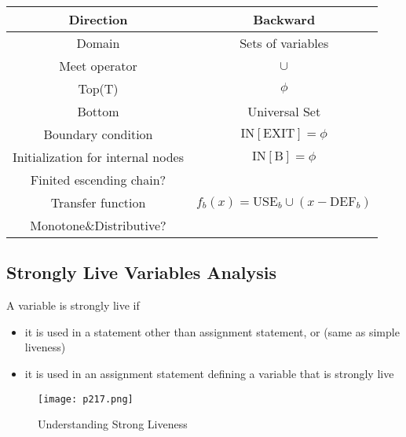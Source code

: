 \begin{center}
	\begin{tabular}{|c|c|}
		\hline Direction                         & Backward                                            \\
		\hline Domain                            & Sets	of	variables                                     \\
		\hline Meet operator                     & \( \cup \)                                          \\
		\hline Top(T)                            & $\phi$                                              \\
		\hline Bottom                            & Universal Set                                       \\
		\hline Boundary condition                & $\mathrm{IN[EXIT]} = \phi$                          \\
		\hline Initialization for internal nodes & $\mathrm{IN[B]} = \phi$                             \\
		\hline Finited escending chain?          & \checkmark                                          \\
		\hline Transfer function                 & $f_b(x) = \mathrm{USE}_b \cup (x - \mathrm{DEF}_b)$ \\
		\hline Monotone\&Distributive?           & \checkmark                                          \\
		\hline
	\end{tabular}
\end{center}




\subsection{Strongly Live Variables Analysis\cite{LiveVari29:online}}

A variable is strongly live if
\begin{itemize}

	\item it is used in a statement other than assignment statement, or
	      (same as simple liveness)
	\item it is used in an assignment statement defining a variable that is
	      strongly live
\end{itemize}


\begin{figure}[H]
	\centering
	\texttt{[image: p217.png]}
	\caption{Understanding Strong Liveness}
	\label{fig:p217}
\end{figure}



